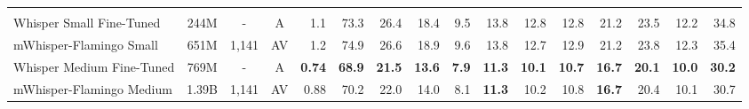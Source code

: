 \begin{table*}[t]
{\begin{tabular}{lcccrrrrrrrrrrrr}
\hline
\rowcolor{Gray}\multicolumn{16}{c}{\textit{Our Models}} \\
Whisper Small Fine-Tuned & 244M & - & A & 1.1 & 73.3 & 26.4 & 18.4 & 9.5 & 13.8 & 12.8 & 12.8 & 21.2 & 23.5 & 12.2 & 34.8 \\
mWhisper-Flamingo Small & 651M & 1,141& AV & 1.2 & 74.9 & 26.6 & 18.9 & 9.6 & 13.8 & 12.7 & 12.9 & 21.2 & 23.8 & 12.3 & 35.4 \\
Whisper Medium Fine-Tuned & 769M & - & A & \bf{0.74} & \bf{68.9} & \bf{21.5} & \bf{13.6} & \bf{7.9} & \bf{11.3} & \bf{10.1} & \bf{10.7} & \bf{16.7} & \bf{20.1} & \bf{10.0} & \bf{30.2} \\
mWhisper-Flamingo Medium & 1.39B & 1,141& AV & 0.88 & 70.2 & 22.0 & 14.0 & 8.1 & \bf{11.3} & 10.2 & 10.8 & \bf{16.7} & 20.4 & 10.1 & 30.7\\
\bottomrule
\end{tabular}%
}
\vspace{-0.4cm}
\end{table*}